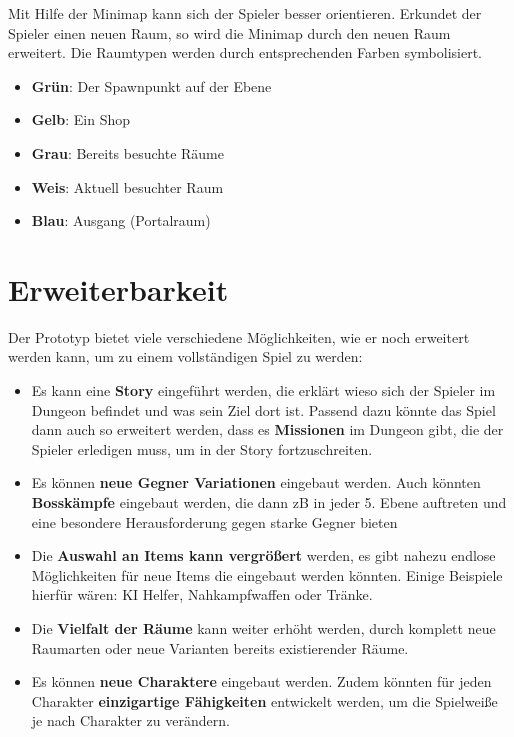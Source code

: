 Mit Hilfe der Minimap kann sich der Spieler besser orientieren. Erkundet der Spieler einen neuen Raum, so wird die Minimap durch den neuen Raum erweitert. Die Raumtypen werden durch entsprechenden Farben symbolisiert.

\begin{itemize}
\item \textbf{Grün}: Der Spawnpunkt auf der Ebene
\item \textbf{Gelb}: Ein Shop
\item \textbf{Grau}: Bereits besuchte Räume
\item \textbf{Weis}: Aktuell besuchter Raum
\item \textbf{Blau}: Ausgang (Portalraum)
\end{itemize}



\section{Erweiterbarkeit}
Der Prototyp bietet viele verschiedene Möglichkeiten, wie er noch erweitert werden kann, um zu einem vollständigen Spiel zu werden:
\begin{itemize}
\item Es kann eine \textbf{Story} eingeführt werden, die erklärt wieso sich der Spieler im Dungeon befindet und was sein Ziel dort ist. Passend dazu könnte das Spiel dann auch so erweitert werden, dass es \textbf{Missionen} im Dungeon gibt, die der Spieler erledigen muss, um in der Story fortzuschreiten.
\item Es können \textbf{neue Gegner Variationen} eingebaut werden. Auch könnten \textbf{Bosskämpfe} eingebaut werden, die dann zB in jeder 5. Ebene auftreten und eine besondere Herausforderung gegen starke Gegner bieten
\item Die \textbf{Auswahl an Items kann vergrößert} werden, es gibt nahezu endlose Möglichkeiten für neue Items die eingebaut werden könnten. Einige Beispiele hierfür wären: KI Helfer, Nahkampfwaffen oder Tränke.
\item Die \textbf{Vielfalt der Räume} kann weiter erhöht werden, durch komplett neue Raumarten oder neue Varianten bereits existierender Räume.
\item Es können \textbf{neue Charaktere} eingebaut werden. Zudem könnten für jeden Charakter \textbf{einzigartige Fähigkeiten} entwickelt werden, um die Spielweiße je nach Charakter zu verändern.
\end{itemize}

